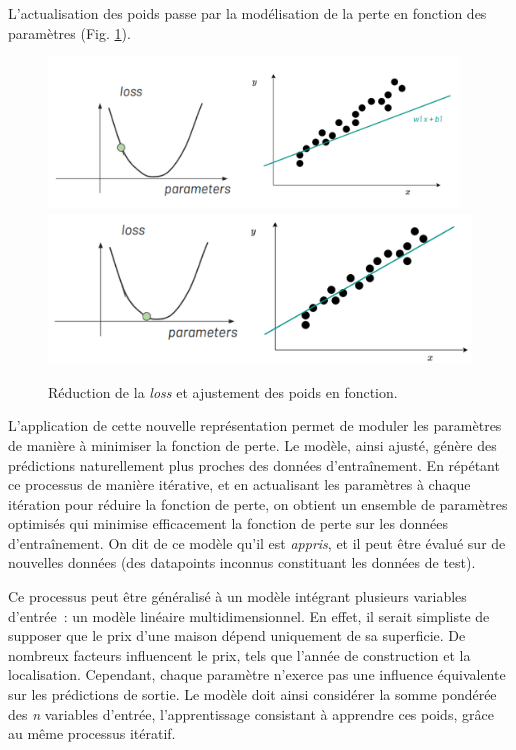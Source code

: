 L'actualisation des poids passe par la modélisation de la perte en
fonction des paramètres (Fig. \ref{fig:loss2}).

          \begin{figure}[H]
          \begin{center}
          \includegraphics[height=4cm]{figues/modele_lineaire_2.png}
          \includegraphics[height=4cm]{figues/modele_lineaire_3.png}
          \end{center}
          \caption{Réduction de la \emph{loss} et ajustement des poids en fonction.}
          \label{fig:loss2} \end{figure}

L'application de cette nouvelle représentation permet de moduler les
paramètres de manière à minimiser la fonction de perte. Le modèle, ainsi
ajusté, génère des prédictions naturellement plus proches des données
d'entraînement. En répétant ce processus de manière itérative, et en
actualisant les paramètres à chaque itération pour réduire la fonction
de perte, on obtient un ensemble de paramètres optimisés qui minimise
efficacement la fonction de perte sur les données d'entraînement. On dit
de ce modèle qu'il est \emph{appris}, et il peut être évalué sur de
nouvelles données (des datapoints inconnus constituant les données de
test).

Ce processus peut être généralisé à un modèle intégrant plusieurs
variables d'entrée~: un modèle linéaire multidimensionnel. En effet, il
serait simpliste de supposer que le prix d'une maison dépend uniquement
de sa superficie. De nombreux facteurs influencent le prix, tels que
l'année de construction et la localisation. Cependant, chaque paramètre
n'exerce pas une influence équivalente sur les prédictions de sortie. Le
modèle doit ainsi considérer la somme pondérée des \emph{n} variables
d'entrée, l'apprentissage consistant à apprendre ces poids, grâce au même processus itératif.

